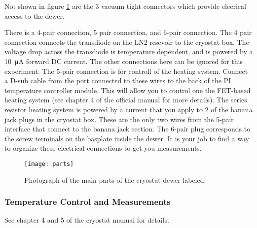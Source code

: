\documentclass[m_cmp_sc_manual.tex]{subfiles}
\begin{document}
\vspace{2em}
Not shown in figure \ref{fig:parts} are the 3 vacuum tight connectors which
provide elecrical access to the dewer.

There is a 4-pair connection, 5 pair connection, and 6-pair connection. The 4
pair connection connects the transdiode on the LN2 resevoir to the cryostat box.
The voltage drop across the transdiode is temperature dependent, and is powered
by a \SI{10}{\uA} forward DC current. The other connections here can be ignored for this
experiment. The 5-pair connection is for controll of the heating system. Connect
a D-sub cable from the port connected to these wires to the back of the PI
temperature controller module. This will allow you to control one the FET-based
heating system (see chapter 4 of the official manual for more details). The
series resistor heating system is powered by a current that you apply to 2 of
the banana jack plugs in the cryostat box. These are the only two wires from the
5-pair interface that connect to the banana jack section. The 6-pair plug
corresponds to the screw terminals on the basplate inside the dewer. It is your
job to find a way to organize these electrical connections to get you
measurements. 

\begin{figure}
  \texttt{[image: parts]}
  \caption{\label{fig:parts} Photograph of the main parts of the cryostat dewer
  labeled.}
\end{figure}
\subsubsection{Temperature Control and Measurements}
See chapter 4 and 5 of the cryostat manual for details. 
\end{document}
